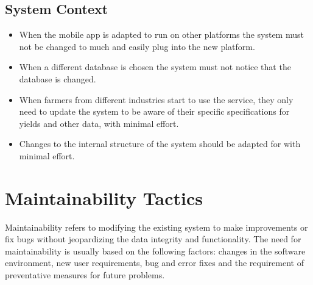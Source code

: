 \documentclass[11pt,fleqn]{book} %
\begin{document}
	\subsection{System Context}
	\begin{itemize}
		\item When the mobile app is adapted to run on other platforms the system must not be changed to much and easily plug into the new platform.
		\item When a different database is chosen the system must not notice that the database is changed.
		\item When farmers from different industries start to use the service, they only need to update the system to be aware of their specific specifications for yields and other data, with minimal effort.
		\item Changes to the internal structure of the system should be adapted for with minimal effort.
	\end{itemize}
	\section{Maintainability Tactics}
	Maintainability refers to modifying the existing system to make improvements or fix bugs without jeopardizing the data integrity and functionality. The need for maintainability is usually based on the following factors: changes in the software environment, new user requirements, bug and error fixes and the requirement of preventative measures for future problems.
\end{document}
